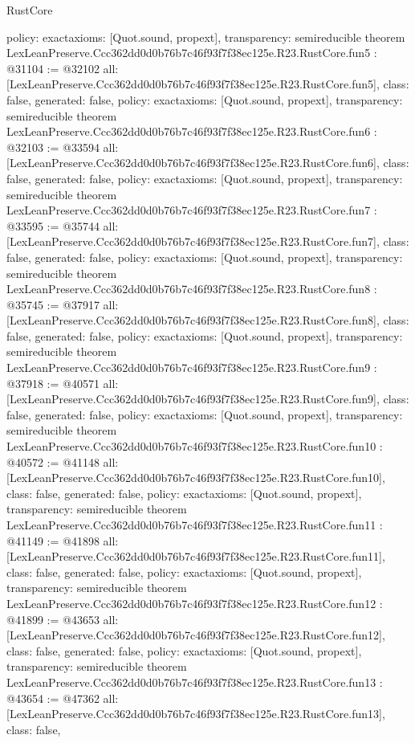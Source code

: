 \begin{lexlean}{RustCore}
\begin{coremodule}
{  policy: exact{axioms: [Quot.sound, propext]},
  transparency: semireducible
}
theorem LexLeanPreserve.Ccc362dd0d0b76b7c46f93f7f38ec125e.R23.RustCore.fun5 : @31104 := @32102 {
  all: [LexLeanPreserve.Ccc362dd0d0b76b7c46f93f7f38ec125e.R23.RustCore.fun5],
  class: false,
  generated: false,
  policy: exact{axioms: [Quot.sound, propext]},
  transparency: semireducible
}
theorem LexLeanPreserve.Ccc362dd0d0b76b7c46f93f7f38ec125e.R23.RustCore.fun6 : @32103 := @33594 {
  all: [LexLeanPreserve.Ccc362dd0d0b76b7c46f93f7f38ec125e.R23.RustCore.fun6],
  class: false,
  generated: false,
  policy: exact{axioms: [Quot.sound, propext]},
  transparency: semireducible
}
theorem LexLeanPreserve.Ccc362dd0d0b76b7c46f93f7f38ec125e.R23.RustCore.fun7 : @33595 := @35744 {
  all: [LexLeanPreserve.Ccc362dd0d0b76b7c46f93f7f38ec125e.R23.RustCore.fun7],
  class: false,
  generated: false,
  policy: exact{axioms: [Quot.sound, propext]},
  transparency: semireducible
}
theorem LexLeanPreserve.Ccc362dd0d0b76b7c46f93f7f38ec125e.R23.RustCore.fun8 : @35745 := @37917 {
  all: [LexLeanPreserve.Ccc362dd0d0b76b7c46f93f7f38ec125e.R23.RustCore.fun8],
  class: false,
  generated: false,
  policy: exact{axioms: [Quot.sound, propext]},
  transparency: semireducible
}
theorem LexLeanPreserve.Ccc362dd0d0b76b7c46f93f7f38ec125e.R23.RustCore.fun9 : @37918 := @40571 {
  all: [LexLeanPreserve.Ccc362dd0d0b76b7c46f93f7f38ec125e.R23.RustCore.fun9],
  class: false,
  generated: false,
  policy: exact{axioms: [Quot.sound, propext]},
  transparency: semireducible
}
theorem LexLeanPreserve.Ccc362dd0d0b76b7c46f93f7f38ec125e.R23.RustCore.fun10 : @40572 := @41148 {
  all: [LexLeanPreserve.Ccc362dd0d0b76b7c46f93f7f38ec125e.R23.RustCore.fun10],
  class: false,
  generated: false,
  policy: exact{axioms: [Quot.sound, propext]},
  transparency: semireducible
}
theorem LexLeanPreserve.Ccc362dd0d0b76b7c46f93f7f38ec125e.R23.RustCore.fun11 : @41149 := @41898 {
  all: [LexLeanPreserve.Ccc362dd0d0b76b7c46f93f7f38ec125e.R23.RustCore.fun11],
  class: false,
  generated: false,
  policy: exact{axioms: [Quot.sound, propext]},
  transparency: semireducible
}
theorem LexLeanPreserve.Ccc362dd0d0b76b7c46f93f7f38ec125e.R23.RustCore.fun12 : @41899 := @43653 {
  all: [LexLeanPreserve.Ccc362dd0d0b76b7c46f93f7f38ec125e.R23.RustCore.fun12],
  class: false,
  generated: false,
  policy: exact{axioms: [Quot.sound, propext]},
  transparency: semireducible
}
theorem LexLeanPreserve.Ccc362dd0d0b76b7c46f93f7f38ec125e.R23.RustCore.fun13 : @43654 := @47362 {
  all: [LexLeanPreserve.Ccc362dd0d0b76b7c46f93f7f38ec125e.R23.RustCore.fun13],
  class: false,
}
\end{coremodule}
\end{lexlean}
